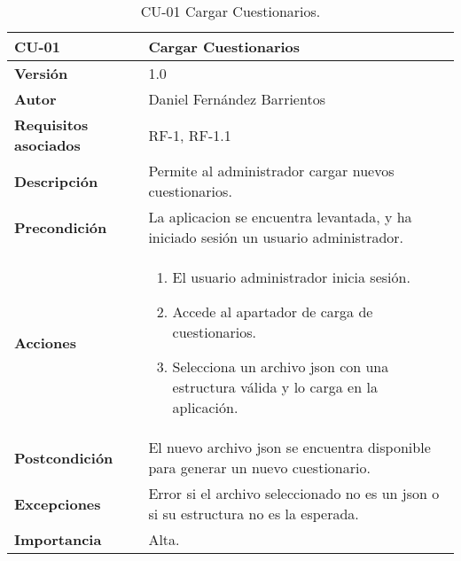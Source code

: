 \begin{table}[p]
	\centering
	\begin{tabularx}{\linewidth}{ p{} p{} }
		\toprule
		\textbf{CU-01}    & \textbf{Cargar Cuestionarios}\\
		\toprule
		\textbf{Versión}              & 1.0    \\
		\textbf{Autor}                & Daniel Fernández Barrientos \\
		\textbf{Requisitos asociados} & RF-1, RF-1.1 \\
		\textbf{Descripción}          & Permite al administrador cargar nuevos cuestionarios. \\
		\textbf{Precondición}         & La aplicacion se encuentra levantada, y ha iniciado sesión un usuario administrador. \\
		\textbf{Acciones}             &
		\begin{enumerate}
			\def\labelenumi{\arabic{enumi}.}
			\tightlist
			\item El usuario administrador inicia sesión.
			\item Accede al apartador de carga de cuestionarios.
			\item Selecciona un archivo json con una estructura válida y lo carga en la aplicación.
		\end{enumerate}\\
		\textbf{Postcondición}        & El nuevo archivo json se encuentra disponible para generar un nuevo cuestionario. \\
		\textbf{Excepciones}          & Error si el archivo seleccionado no es un json o si su estructura no es la esperada. \\
		\textbf{Importancia}          & Alta. \\
		\bottomrule
	\end{tabularx}
	\caption{CU-01 Cargar Cuestionarios.}
\end{table}

